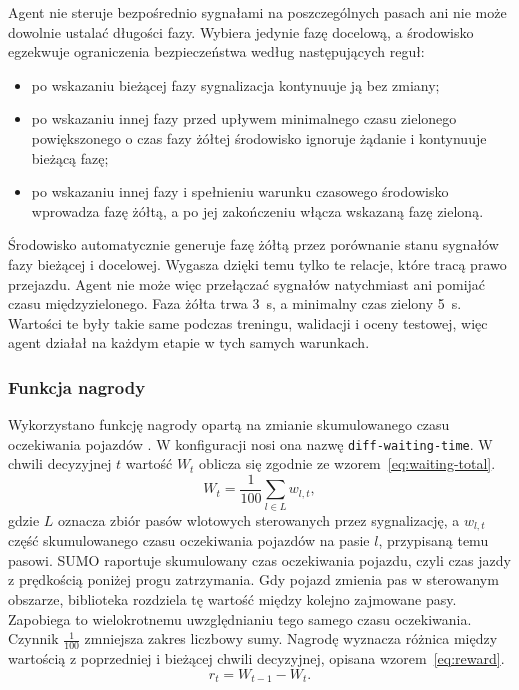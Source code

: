 Agent nie steruje bezpośrednio sygnałami na poszczególnych pasach ani nie może dowolnie ustalać długości fazy. Wybiera jedynie fazę docelową, a środowisko egzekwuje ograniczenia bezpieczeństwa według następujących reguł:
\begin{itemize}
    \item po wskazaniu bieżącej fazy sygnalizacja kontynuuje ją bez zmiany;
    \item po wskazaniu innej fazy przed upływem minimalnego czasu zielonego powiększonego o czas fazy żółtej środowisko ignoruje żądanie i kontynuuje bieżącą fazę;
    \item po wskazaniu innej fazy i spełnieniu warunku czasowego środowisko wprowadza fazę żółtą, a po jej zakończeniu włącza wskazaną fazę zieloną.
\end{itemize}

Środowisko automatycznie generuje fazę żółtą przez porównanie stanu sygnałów fazy bieżącej i docelowej. Wygasza dzięki temu tylko te relacje, które tracą prawo przejazdu. Agent nie może więc przełączać sygnałów natychmiast ani pomijać czasu międzyzielonego. Faza żółta trwa 3~s, a minimalny czas zielony 5~s. Wartości te były takie same podczas treningu, walidacji i oceny testowej, więc agent działał na każdym etapie w tych samych warunkach.

\subsubsection{Funkcja nagrody}
\label{subsubsec:nagroda}

Wykorzystano funkcję nagrody opartą na zmianie skumulowanego czasu oczekiwania pojazdów \cite{alegre2019sumorl}. W konfiguracji nosi ona nazwę \texttt{diff-waiting-time}. W chwili decyzyjnej $t$ wartość $W_t$ oblicza się zgodnie ze wzorem~\ref{eq:waiting-total}.
\begin{equation}
    W_t = \frac{1}{100} \sum_{l \in L} w_{l,t},
    \label{eq:waiting-total}
\end{equation}
gdzie $L$ oznacza zbiór pasów wlotowych sterowanych przez sygnalizację, a $w_{l,t}$ część skumulowanego czasu oczekiwania pojazdów na pasie $l$, przypisaną temu pasowi. SUMO raportuje skumulowany czas oczekiwania pojazdu, czyli czas jazdy z prędkością poniżej progu zatrzymania. Gdy pojazd zmienia pas w sterowanym obszarze, biblioteka rozdziela tę wartość między kolejno zajmowane pasy. Zapobiega to wielokrotnemu uwzględnianiu tego samego czasu oczekiwania. Czynnik $\frac{1}{100}$ zmniejsza zakres liczbowy sumy. Nagrodę wyznacza różnica między wartością z poprzedniej i bieżącej chwili decyzyjnej, opisana wzorem~\ref{eq:reward}.
\begin{equation}
    r_t = W_{t-1} - W_t.
    \label{eq:reward}
\end{equation}

